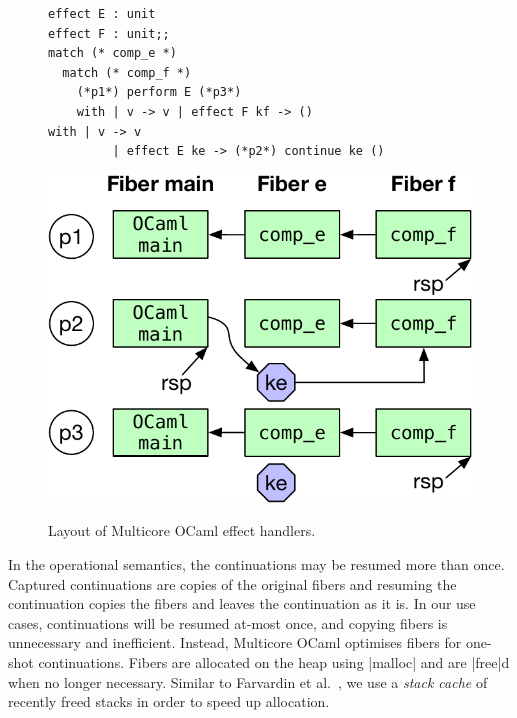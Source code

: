 \documentclass[sigplan,10pt,review,anonymous]{acmart}\settopmatter{printfolios=true,printccs=false,printacmref=false}
\begin{document}
\begin{figure}
\begin{minipage}{0.64\linewidth}
\begin{minipage}{\linewidth}
    \label{fig:mcstack}
    \vspace{2mm}
  \end{minipage}
  \begin{minipage}{0.55\linewidth}
    \begin{lstlisting}
effect E : unit
effect F : unit;;
match (* comp_e *)
  match (* comp_f *)
    (*p1*) perform E (*p3*)
	with | v -> v | effect F kf -> ()
with | v -> v
		 | effect E ke -> (*p2*) continue ke ()
    \end{lstlisting}
		\label{code:effimpl}
  \end{minipage}
  \begin{minipage}{0.44\linewidth}
    \centering
    \includegraphics[scale=0.42]{figures/fiber_handler}
    \label{fig:fiber_handler}
  \end{minipage}
\end{minipage}
\vspace{-2mm}
\caption{Layout of Multicore OCaml effect handlers.}
\vspace{-3mm}
\end{figure}

In the operational semantics, the continuations may be resumed more than once.
Captured continuations are copies of the original fibers and resuming the
continuation copies the fibers and leaves the continuation as it is. In our use
cases, continuations will be resumed at-most once, and copying fibers is
unnecessary and inefficient. Instead, Multicore OCaml optimises fibers for
one-shot continuations. Fibers are allocated on the heap using |malloc| and are
|free|d when no longer necessary. Similar to Farvardin et
al.~\cite{Farvardin20}, we use a \emph{stack cache} of recently freed stacks in
order to speed up allocation.
\end{document}
